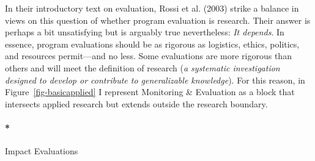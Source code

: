 \documentclass[
  letterpaper,
  DIV=11,
  numbers=noendperiod,
  oneside]{scrreprt}
\let\oldparagraph\paragraph
\renewcommand{\paragraph}[1]{\oldparagraph{#1}\mbox{}}
\begin{document}
In their introductory text on evaluation, Rossi et al.
(2003)
strike a balance in views on this question of whether program evaluation
is research. Their answer is perhaps a bit unsatisfying but is arguably
true nevertheless: \emph{It depends}. In essence, program evaluations
should be as rigorous as logistics, ethics, politics, and resources
permit---and no less. Some evaluations are more rigorous than others and
will meet the definition of research (\emph{a systematic investigation
designed to develop or contribute to generalizable knowledge}). For this
reason, in Figure~\ref{fig-basicapplied} I represent Monitoring \&
Evaluation as a block that intersects applied research but extends
outside the research boundary.

\hypertarget{impact-evaluations}{%
\paragraph*{Impact Evaluations}\label{impact-evaluations}}

\end{document}
